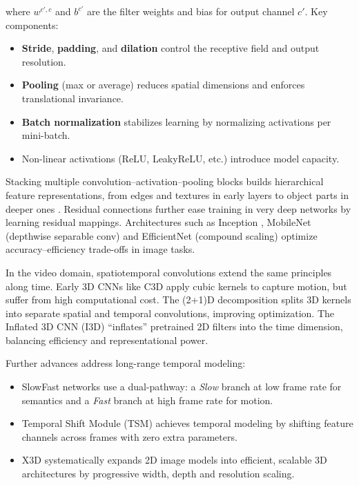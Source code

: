 where \(w^{c',c}\) and \(b^{c'}\) are the filter weights and bias for output channel \(c'\).  
Key components:
\begin{itemize}
    \item \textbf{Stride}, \textbf{padding}, and \textbf{dilation} control the receptive field and output resolution.
    \item \textbf{Pooling} (max or average) reduces spatial dimensions and enforces translational invariance.
    \item \textbf{Batch normalization} stabilizes learning by normalizing activations per mini-batch.
    \item Non-linear activations (ReLU, LeakyReLU, etc.) introduce model capacity.
\end{itemize}

Stacking multiple convolution–activation–pooling blocks builds hierarchical feature representations, from edges and textures in early layers to object parts in deeper ones \cite{lecun_deep_learning_2015}.  Residual connections \cite{he_deep_residual_2015} further ease training in very deep networks by learning residual mappings.  Architectures such as Inception \cite{szegedy_going_2014}, MobileNet (depthwise separable conv) \cite{howard_mobilenets_2017} and EfficientNet (compound scaling) \cite{tan_efficientnet_2020} optimize accuracy–efficiency trade-offs in image tasks.

In the video domain, spatiotemporal convolutions extend the same principles along time.  Early 3D CNNs like C3D \cite{tran_learning_2015} apply cubic kernels to capture motion, but suffer from high computational cost.  The (2+1)D decomposition \cite{tran_2_plus_1_convolution} splits 3D kernels into separate spatial and temporal convolutions, improving optimization.  The Inflated 3D CNN (I3D) \cite{carreira_2017_i3d_quo_vadis} “inflates” pretrained 2D filters into the time dimension, balancing efficiency and representational power.

Further advances address long-range temporal modeling:
\begin{itemize}
    \item SlowFast networks \cite{feichtenhofer_slowfast_2019} use a dual-pathway: a \emph{Slow} branch at low frame rate for semantics and a \emph{Fast} branch at high frame rate for motion.  
    \item Temporal Shift Module (TSM) \cite{lin_temporal_shift_2019} achieves temporal modeling by shifting feature channels across frames with zero extra parameters.  
    \item X3D \cite{feichtenhofer_x3d_2020} systematically expands 2D image models into efficient, scalable 3D architectures by progressive width, depth and resolution scaling.
\end{itemize}

